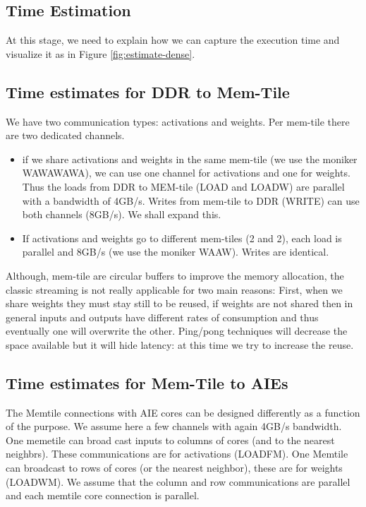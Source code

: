 \documentclass[conference]{IEEEtran}
\begin{document}


\subsection{Time Estimation}
At this stage, we need to explain how we can capture the execution
time and visualize it as in Figure \ref{fig:estimate-dense}.

\subsection{Time estimates for DDR to Mem-Tile}
We have two communication types: activations and weights. Per
mem-tile there are two dedicated channels.
\begin{itemize}
 \item if we share activations and weights in the same mem-tile (we
   use the moniker WAWAWAWA), we can use one channel for activations
   and one for weights. Thus the loads from DDR to MEM-tile (LOAD and
   LOADW) are parallel with a bandwidth of 4GB/s. Writes from mem-tile
   to DDR (WRITE) can use both channels (8GB/s). We shall expand this.

 \item If activations and weights go to different mem-tiles (2 and 2),
   each load is parallel and 8GB/s (we use the moniker WAAW). Writes
   are identical.
\end{itemize}
Although, mem-tile are circular buffers to improve the memory
allocation, the classic streaming is not really applicable for two
main reasons: First, when we share weights they must stay still to be
reused, if weights are not shared then in general inputs and outputs
have different rates of consumption and thus eventually one will
overwrite the other. Ping/pong techniques will decrease the space
available but it will hide latency: at this time we try to increase
the reuse.
   
\subsection{Time estimates for Mem-Tile to AIEs}

The Memtile connections with AIE cores can be designed differently as
a function of the purpose. We assume here a few channels with again
4GB/s bandwidth. One memetile can broad cast inputs to columns of
cores (and to the nearest neighbrs). These communications are for
activations (LOADFM). One Memtile can broadcast to rows of cores (or
the nearest neighbor), these are for weights (LOADWM). We assume that
the column and row communications are parallel and each memtile core
connection is parallel.
\end{document}
